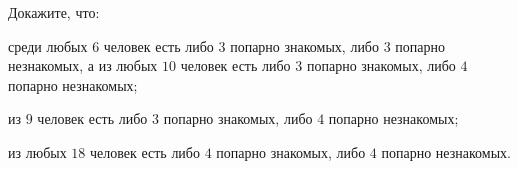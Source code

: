 Докажите, что:
\begin{enumcyr}
    \item среди любых $6$ человек есть либо $3$ попарно знакомых, либо $3$ попарно незнакомых, а из любых
        $10$ человек есть либо $3$ попарно знакомых, либо $4$ попарно незнакомых;
    \item из $9$ человек есть либо $3$ попарно знакомых, либо $4$ попарно незнакомых;
    \item из любых $18$ человек есть либо $4$ попарно знакомых, либо $4$ попарно незнакомых.
\end{enumcyr}